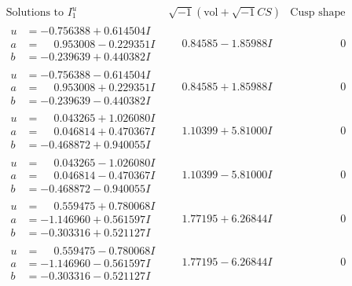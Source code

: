 \documentclass[1p]{elsarticle_modified}
\theoremstyle{definition}
\newcommand{\I}{\sqrt{-1}}
\begin{document}
$$\begin{array}{c|c|c}  
\text{Solutions to }I^u_{1}& \I (\text{vol} + \sqrt{-1}CS) & \text{Cusp shape}\\
 \hline 
\begin{aligned}
u &= -0.756388 + 0.614504 I \\
a &= \phantom{-}0.953008 - 0.229351 I \\
b &= -0.239639 + 0.440382 I\end{aligned}
 & \phantom{-}0.84585 - 1.85988 I & \phantom{-0.000000 } 0 \\ \hline\begin{aligned}
u &= -0.756388 - 0.614504 I \\
a &= \phantom{-}0.953008 + 0.229351 I \\
b &= -0.239639 - 0.440382 I\end{aligned}
 & \phantom{-}0.84585 + 1.85988 I & \phantom{-0.000000 } 0 \\ \hline\begin{aligned}
u &= \phantom{-}0.043265 + 1.026080 I \\
a &= \phantom{-}0.046814 + 0.470367 I \\
b &= -0.468872 + 0.940055 I\end{aligned}
 & \phantom{-}1.10399 + 5.81000 I & \phantom{-0.000000 } 0 \\ \hline\begin{aligned}
u &= \phantom{-}0.043265 - 1.026080 I \\
a &= \phantom{-}0.046814 - 0.470367 I \\
b &= -0.468872 - 0.940055 I\end{aligned}
 & \phantom{-}1.10399 - 5.81000 I & \phantom{-0.000000 } 0 \\ \hline\begin{aligned}
u &= \phantom{-}0.559475 + 0.780068 I \\
a &= -1.146960 + 0.561597 I \\
b &= -0.303316 + 0.521127 I\end{aligned}
 & \phantom{-}1.77195 + 6.26844 I & \phantom{-0.000000 } 0 \\ \hline\begin{aligned}
u &= \phantom{-}0.559475 - 0.780068 I \\
a &= -1.146960 - 0.561597 I \\
b &= -0.303316 - 0.521127 I\end{aligned}
 & \phantom{-}1.77195 - 6.26844 I & \phantom{-0.000000 } 0 \\ \hline\begin{aligned}

\end{aligned}
\end{array}$$
\end{document}

